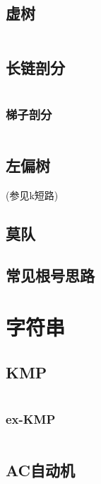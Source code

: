 \documentclass[a4paper, twoside]{article}
\begin{document}
\begin{multicols}{2}
	
			\subsection{虚树}
				\inputminted{cpp}{../src/datastructure/虚树.cpp}
	
			\subsection{长链剖分}
				\inputminted{cpp}{../src/datastructure/长链剖分.cpp}
	
			\subsubsection{梯子剖分}
				\inputminted{cpp}{../src/datastructure/梯子剖分.cpp}
					
			\subsection{左偏树}
				(参见k短路)
			
			\subsection{莫队}
				
	
			\subsection{常见根号思路}
				

		\section{字符串}
			\subsection{KMP}
				\inputminted{cpp}{../src/string/KMP.cpp}
				
				\subsubsection{ex-KMP}
					\inputminted{cpp}{../src/string/exKMP.cpp}

			\subsection{AC自动机}
				\inputminted{cpp}{../src/string/AC自动机.cpp}


\end{multicols}
\end{document}
